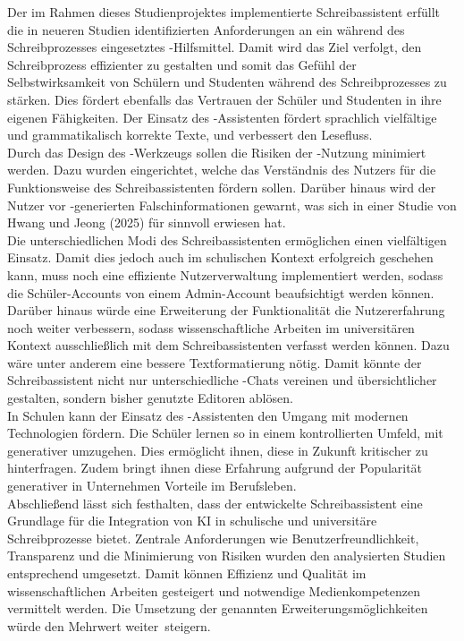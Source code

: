 \documentclass[../main.tex]{subfiles}
\begin{document}
Der im Rahmen dieses Studienprojektes implementierte Schreibassistent erfüllt die in neueren Studien identifizierten Anforderungen an ein während des Schreibprozesses eingesetztes 
-Hilfsmittel. Damit wird das Ziel verfolgt, den Schreibprozess effizienter zu gestalten und somit das Gefühl der Selbstwirksamkeit von Schülern und Studenten während des 
Schreibprozesses zu stärken. Dies fördert ebenfalls das Vertrauen der Schüler und Studenten in ihre eigenen Fähigkeiten. Der Einsatz des -Assistenten fördert sprachlich vielfältige 
und grammatikalisch korrekte Texte, und verbessert den Lesefluss. \\
Durch das Design des -Werkzeugs sollen die Risiken der -Nutzung minimiert werden. Dazu wurden  eingerichtet, welche das Verständnis des Nutzers für die Funktionsweise des 
Schreibassistenten fördern sollen. Darüber hinaus wird der Nutzer vor -generierten Falschinformationen gewarnt, was sich in einer Studie von Hwang und Jeong (2025) für sinnvoll 
erwiesen hat. \\

Die unterschiedlichen Modi des Schreibassistenten ermöglichen einen vielfältigen Einsatz. Damit dies jedoch auch im schulischen Kontext erfolgreich geschehen kann, muss noch eine 
effiziente Nutzerverwaltung implementiert werden, sodass die Schüler-Accounts von einem Admin-Account beaufsichtigt werden können.\\
Darüber hinaus würde eine Erweiterung der Funktionalität die Nutzererfahrung noch weiter verbessern, sodass wissenschaftliche Arbeiten im universitären Kontext ausschließlich 
mit dem Schreibassistenten verfasst werden können. Dazu wäre unter anderem eine bessere Textformatierung nötig. Damit könnte der Schreibassistent nicht nur unterschiedliche -Chats vereinen und übersichtlicher gestalten, sondern bisher genutzte 
Editoren ablösen.\\
In Schulen kann der Einsatz des -Assistenten den Umgang mit modernen Technologien fördern. Die Schüler lernen so in einem kontrollierten Umfeld, mit generativer  umzugehen. 
Dies ermöglicht ihnen, diese in Zukunft kritischer zu hinterfragen. Zudem bringt ihnen diese Erfahrung aufgrund der Popularität generativer  in Unternehmen Vorteile im Berufsleben.\\
Abschließend lässt sich festhalten, dass der entwickelte Schreibassistent eine Grundlage für die Integration von KI in schulische und universitäre Schreibprozesse bietet. 
Zentrale Anforderungen wie Benutzerfreundlichkeit, Transparenz und die Minimierung von Risiken wurden den analysierten Studien entsprechend umgesetzt. 
Damit können Effizienz und Qualität im wissenschaftlichen Arbeiten gesteigert und notwendige Medienkompetenzen vermittelt werden. Die Umsetzung der genannten Erweiterungsmöglichkeiten würde 
den Mehrwert \mbox{weiter steigern.} 
\end{document}
